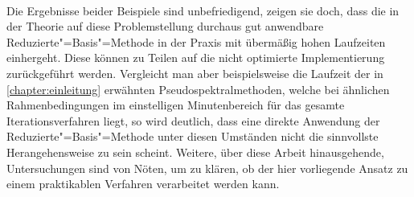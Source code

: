 \documentclass[../main.tex]{subfiles}
\begin{document}
\paragraph{}
Die Ergebnisse beider Beispiele sind unbefriedigend, zeigen sie doch, dass die in der Theorie auf diese Problemstellung durchaus gut anwendbare Reduzierte"=Basis"=Methode in der Praxis mit übermäßig hohen Laufzeiten einhergeht.
Diese können zu Teilen auf die nicht optimierte Implementierung zurückgeführt werden.
Vergleicht man aber beispielsweise die Laufzeit der in \cref{chapter:einleitung} erwähnten Pseudospektralmethoden, welche bei ähnlichen Rahmenbedingungen im einstelligen Minutenbereich für das gesamte Iterationsverfahren liegt, so wird deutlich, dass eine direkte Anwendung der Reduzierte"=Basis"=Methode unter diesen Umständen nicht die sinnvollste Herangehensweise zu sein scheint.
Weitere, über diese Arbeit hinausgehende, Untersuchungen sind von Nöten, um zu klären, ob der hier vorliegende Ansatz zu einem praktikablen Verfahren verarbeitet werden kann.
\end{document}
